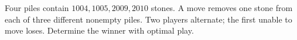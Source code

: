 Four piles contain $1004,1005,2009,2010$ stones. A move removes one stone from each of three different nonempty piles. Two players alternate; the first unable to move loses. Determine the winner with optimal play.
